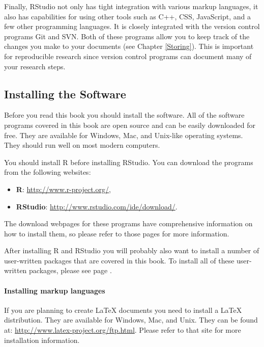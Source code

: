 Finally, RStudio not only has tight integration with various markup languages, it also has capabilities for using other tools such as C++, CSS, JavaScript, and a few other programming languages. It is closely integrated with the version control programs Git and SVN. Both of these programs allow you to keep track of the changes you make to your documents (see Chapter \ref{Storing}). This is important for reproducible research since version control programs can document many of your research steps. 

\subsection{Installing the Software}\label{InstallR}

Before you read this book you should install the software. All of the software programs covered in this book are open source and can be easily downloaded for free. They are available for Windows, Mac, and Unix-like operating systems. They should run well on most modern computers. 

You should install R before installing RStudio. You can download the programs from the following websites:

\begin{itemize}
    \item {\bf{R}}: \url{http://www.r-project.org/},
    \item {\bf{RStudio}}: \url{http://www.rstudio.com/ide/download/}.
\end{itemize}

\noindent The download webpages for these programs have comprehensive information on how to install them, so please refer to those pages for more information.

After installing R and RStudio you will probably also want to install a number of user-written packages that are covered in this book. To install all of these user-written packages, please see page \pageref{ReqPackages}.

\paragraph{Installing markup languages}

If you are planning to create LaTeX documents you need to install a LaTeX distribution. They are available for Windows, Mac, and Unix. They can be found at: \url{http://www.latex-project.org/ftp.html}. Please refer to that site for more installation information.

